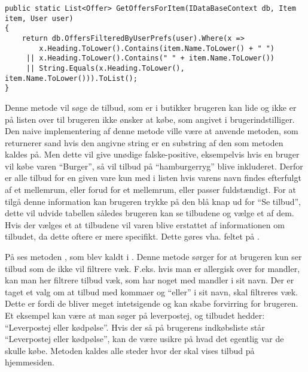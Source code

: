 \begin{lstlisting}[caption="Metoden ``GetOffersForItem'' finder relevante tilbud og returner dem som en liste", label=getoffersforitem]
public static List<Offer> GetOffersForItem(IDataBaseContext db, Item item, User user)
{
    return db.OffersFilteredByUserPrefs(user).Where(x => 
     	x.Heading.ToLower().Contains(item.Name.ToLower() + " ") 
     || x.Heading.ToLower().Contains(" " + item.Name.ToLower()) 
     || String.Equals(x.Heading.ToLower(), item.Name.ToLower())).ToList();
}
\end{lstlisting}

Denne metode vil søge de tilbud, som er i butikker brugeren kan lide og ikke er på listen over til brugeren ikke ønsker at købe, som angivet i brugerindstilliger.
Den naive implementering af denne metode ville være at anvende  metoden, som returnerer sand hvis den angivne string er en substring af den som metoden kaldes på. 
Men dette vil give unødige falske-positive, eksempelvis hvis en bruger vil købe varen ``Burger'', så vil tilbud på ``hamburgerryg'' blive inkluderet.
Derfor er alle tilbud for en given vare kun med i listen hvis varens navn findes efterfulgt af et mellemrum, eller forud for et mellemrum, eller passer fuldstændigt.
For at tilgå denne information kan brugeren trykke på den blå knap ud for  ``Se tilbud'', dette vil udvide tabellen således brugeren kan se tilbudene og vælge et af dem.
Hvis der vælges et at tilbudene vil varen blive erstattet af informationen om tilbudet, da dette oftere er mere specifikt.
Dette gøres vha. feltet  på .

På  ses metoden , som blev kaldt i . Denne metode sørger for at brugeren kun ser tilbud som de ikke vil filtrere væk. F.eks. hvis man er allergisk over for mandler, kan man her filtrere tilbud væk, som har noget med mandler i sit navn. Der er taget et valg om at tilbud med kommaer og ``eller'' i sit navn, skal filtreres væk. Dette er fordi de bliver meget intetsigende og kan skabe forvirring for brugeren. Et eksempel kan være at man søger på leverpostej, og tilbudet hedder: ``Leverpostej eller kødpølse''. Hvis der så på brugerens indkøbsliste står ``Leverpostej eller kødpølse'', kan de være usikre på hvad det egentlig var de skulle købe. Metoden kaldes alle steder hvor der skal vises tilbud på hjemmesiden.

